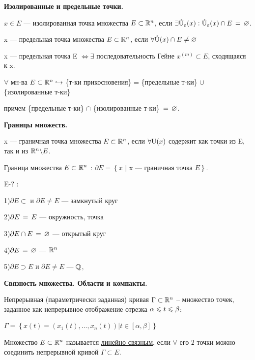  \textbf{Изолированные и предельные точки.}

\Def $x \in E$  --- изолированная точка множества $E \subset \R^n$, если $\exists \Uoe(x) : \Uoe(x) \cap E \eq \varnothing$.

\todo

\Def x --- предельная точка множества $E \subset \R^n$, если $\forall \Uo(x) \cap E \neq \varnothing$

\Note x --- предельная точка E $\Leftrightarrow \exists$ последовательность Гейне ${x^{(m)}} \subset E$, сходящаяся к x.

\Note \parbox[t]{0.95\linewidth}{$\forall$ мн-ва $E \subset \R^n \holds$ \{т-ки прикосновения\} = 
\{предельные т-ки\}  $\cup$ \{изолированные т-ки\} 

причем \{предельные т-ки\}  $\cap$ \{изолированные т-ки\} $\eq \varnothing$. }

\smallskip

 \textbf{Границы множеств.}

\Def x --- граничная точка множества $E \subset \R^n$, если $\forall \U(x)$ содержит как точки из E, так и из $\R^n \backslash E$.

\Def Граница множества  $E \subset \R^n$ : $\partial E = \left\{ x  \text{ | x --- граничная точка } E \right\}$.

\todo  

\Examples E-? : \parbox[t]{0.95\textwidth}{
1)$\partial E \subset$ и $\partial E \neq E$ --- замкнутый круг

2)$\partial E \eq E$ --- окружность, точка

3)$\partial E \cap E \eq \varnothing$  --- открытый круг

4)$\partial E \eq \varnothing$  --- $\R^n$

5)$\partial E \supset E$ и $\partial E \neq E$ --- $\Q$,   }

\smallskip

 \textbf{Связность множества. Области и компакты.}

\Remind Непрерывная (параметрически заданная) кривая $	\Gamma \subset \R^n$ -- множество точек, заданное как непрерывное отображение отрезка $\alpha \Le t \Le \beta$: 

\parbox[t]{0.95\linewidth}{$ \Gamma = \left\{ x(t) = (x_1(t), \ldots, x_n(t)) | t \in [\alpha,\beta] \right\}$}

\Def Множество $E \subset \R^n$ называется \underline{линейно связным}, если $\forall$ его 2 точки можно соединить непрерывной кривой $\Gamma \subset E$.

